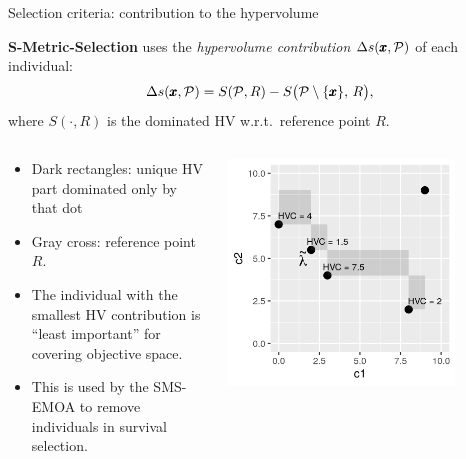 \documentclass[11pt,compress,t,notes=noshow,xcolor=table]{beamer}
\newcommand{\xx}{\conf}     %
\begin{document}


\begin{vbframe}{Selection criteria: contribution to the hypervolume}

\textbf{S-Metric-Selection} uses the \emph{hypervolume contribution} $\Delta s(\xx,\mathcal{P})$ of each individual:
\[
  \Delta s(\xx, \mathcal{P})
  = S(\mathcal{P}, R) - S\bigl(\mathcal{P}\setminus\{\xx\},\,R\bigr),
\]
where $S(\cdot,R)$ is the dominated HV w.r.t.\ reference point $R$.

{\small
\begin{columns}
\begin{column}{0.5\textwidth}
\begin{itemize}
\item Dark rectangles: unique HV part dominated only by that dot
\item Gray cross: reference point $R$.
\item The individual with the smallest HV contribution is “least important” for covering objective space.
\item This is used by the SMS-EMOA to remove individuals in survival selection.
\end{itemize}
\end{column}
\begin{column}{0.5\textwidth}
\begin{center}
\includegraphics[width=0.8\textwidth]{slides/11-multicrit/figure_man/hv_contrib.png}
\end{center}
\end{column}
\end{columns}
}
\end{vbframe}
\end{document}
